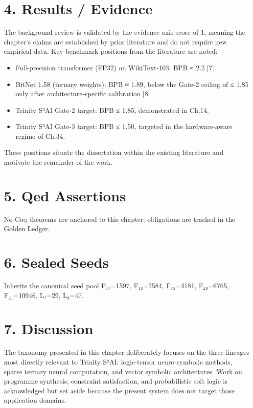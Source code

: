 \section{4. Results /
Evidence}\label{fa_02:results-evidence}

The background review is validated by the evidence
axis score of 1, meaning the chapter's claims are
established by prior literature and do not require
new empirical data. Key benchmark positions from
the literature are noted:

\begin{itemize}
\tightlist
\item
  Full-precision transformer (FP32) on
  WikiText-103: BPB ≈ 2.2 [7].
\item
  BitNet 1.58 (ternary weights): BPB ≈ 1.89, below
  the Gate-2 ceiling of ≤ 1.85 only after
  architecture-specific calibration [8].
\item
  Trinity S³AI Gate-2 target: BPB ≤ 1.85,
  demonstrated in Ch.14.
\item
  Trinity S³AI Gate-3 target: BPB ≤ 1.50, targeted
  in the hardware-aware regime of Ch.34.
\end{itemize}

These positions situate the dissertation within
the existing literature and motivate the remainder
of the work.

\section{5. Qed
Assertions}\label{fa_02:qed-assertions}

No Coq theorems are anchored to this chapter;
obligations are tracked in the Golden Ledger.

\section{6. Sealed Seeds}\label{fa_02:sealed-seeds}

Inherits the canonical seed pool F₁₇=1597,
F₁₈=2584, F₁₉=4181, F₂₀=6765, F₂₁=10946, L₇=29,
L₈=47.

\section{7. Discussion}\label{fa_02:discussion}

The taxonomy presented in this chapter
deliberately focuses on the three lineages most
directly relevant to Trinity S³AI: logic-tensor
neuro-symbolic methods, sparse ternary neural
computation, and vector symbolic architectures.
Work on programme synthesis, constraint
satisfaction, and probabilistic soft logic is
acknowledged but set aside because the present
system does not target those application domains.

